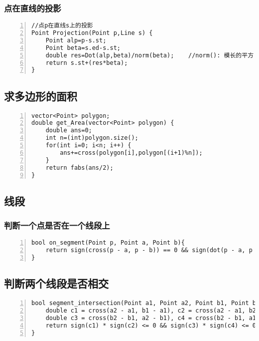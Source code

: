 \subsubsection{点在直线的投影}

\begin{lstlisting}[language={[ANSI]C},numbers=left]
//点p在直线s上的投影
Point Projection(Point p,Line s) {
    Point alp=p-s.st;
    Point beta=s.ed-s.st;
    double res=Dot(alp,beta)/norm(beta);	//norm(): 模长的平方
    return s.st+(res*beta);
}
\end{lstlisting}

\subsection{求多边形的面积}

\begin{lstlisting}[language={[ANSI]C},numbers=left]
vector<Point> polygon;
double get_Area(vector<Point> polygon) {
	double ans=0;
	int n=(int)polygon.size();
	for(int i=0; i<n; i++) {
		ans+=cross(polygon[i],polygon[(i+1)%n]);
	}
	return fabs(ans/2);
}
\end{lstlisting}

\subsection{线段}
\subsubsection{判断一个点是否在一个线段上}

\begin{lstlisting}[language={[ANSI]C},numbers=left]
bool on_segment(Point p, Point a, Point b){
	return sign(cross(p - a, p - b)) == 0 && sign(dot(p - a, p - b)) <= 0;
}
\end{lstlisting}

\subsection{判断两个线段是否相交}
\begin{lstlisting}[language={[ANSI]C},numbers=left]
bool segment_intersection(Point a1, Point a2, Point b1, Point b2){
	double c1 = cross(a2 - a1, b1 - a1), c2 = cross(a2 - a1, b2 - a1);
	double c3 = cross(b2 - b1, a2 - b1), c4 = cross(b2 - b1, a1 - b1);
	return sign(c1) * sign(c2) <= 0 && sign(c3) * sign(c4) <= 0;
}
\end{lstlisting}

